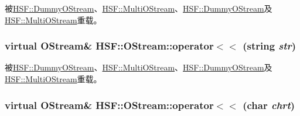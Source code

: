 被\hyperlink{classHSF_1_1DummyOStream_a439a7fa1b22a1e7bcc49fa43c686dc0d}{HSF::DummyOStream}、\hyperlink{classHSF_1_1MultiOStream_a960936ac105e7f2ed4801f0725dedfba}{HSF::MultiOStream}、\hyperlink{classHSF_1_1DummyOStream_a439a7fa1b22a1e7bcc49fa43c686dc0d}{HSF::DummyOStream}及\hyperlink{classHSF_1_1MultiOStream_a960936ac105e7f2ed4801f0725dedfba}{HSF::MultiOStream}重载。\hypertarget{classHSF_1_1OStream_a1e3204a3bf16caf916d3e18c562a709c}{
\subsubsection[{operator$<$$<$}]{\setlength{\rightskip}{0pt plus 5cm}virtual {\bf OStream}\& HSF::OStream::operator$<$$<$ (string {\em str})}}
\label{classHSF_1_1OStream_a1e3204a3bf16caf916d3e18c562a709c}


被\hyperlink{classHSF_1_1DummyOStream_ab67a98f5212d00528d5dda50e9858b7b}{HSF::DummyOStream}、\hyperlink{classHSF_1_1MultiOStream_ab928595ef99d77f13d961541cb2e9f78}{HSF::MultiOStream}、\hyperlink{classHSF_1_1DummyOStream_ab67a98f5212d00528d5dda50e9858b7b}{HSF::DummyOStream}及\hyperlink{classHSF_1_1MultiOStream_ab928595ef99d77f13d961541cb2e9f78}{HSF::MultiOStream}重载。\hypertarget{classHSF_1_1OStream_ad542e8e0a3da490c9df517819fe174ca}{
\subsubsection[{operator$<$$<$}]{\setlength{\rightskip}{0pt plus 5cm}virtual {\bf OStream}\& HSF::OStream::operator$<$$<$ (char {\em chrt})}}
\label{classHSF_1_1OStream_ad542e8e0a3da490c9df517819fe174ca}


